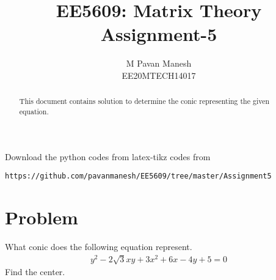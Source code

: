 \documentclass[journal,12pt,twocolumn]{IEEEtran}
\begin{document}
\makeatother
\let\StandardTheFigure\thefigure
\let\vec\mathbf
\renewcommand{\thefigure}{\theproblem}
\def\putbox#1#2#3{\makebox[0in][l]{\makebox[#1][l]{}\raisebox{\baselineskip}[0in][0in]{\raisebox{#2}[0in][0in]{#3}}}}
     \def\rightbox#1{\makebox[0in][r]{#1}}
     \def\centbox#1{\makebox[0in]{#1}}
     \def\topbox#1{\raisebox{-\baselineskip}[0in][0in]{#1}}
     \def\midbox#1{\raisebox{-0.5\baselineskip}[0in][0in]{#1}}
\vspace{3cm}
\title{EE5609: Matrix Theory\\
          Assignment-5\\}
\author{M Pavan Manesh\\
EE20MTECH14017 }
\maketitle
\newpage
\bigskip
\renewcommand{\thefigure}{\theenumi}
\renewcommand{\thetable}{\theenumi}
\begin{abstract}
This document contains solution to determine the conic representing the given equation. 
\end{abstract}
Download the python codes from 
%
%
latex-tikz codes from 
%
\begin{lstlisting}
https://github.com/pavanmanesh/EE5609/tree/master/Assignment5
\end{lstlisting}
%
\section{Problem}
What conic does the following equation represent. 
\begin{align*}
y^2-2\sqrt{3}xy+3x^2+6x-4y+5 = 0
\end{align*}
Find the center.
\end{document}
